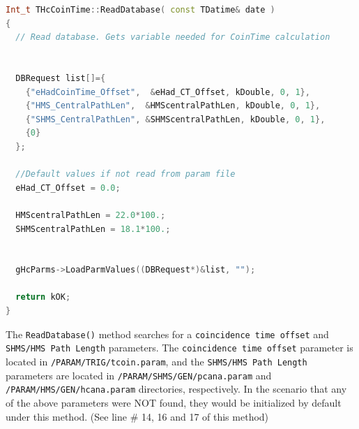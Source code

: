 \documentclass[14pt]{article}
\begin{document}
\begin{lstlisting}[language=C++, caption={THcCoinTime.cxx, The ReadDatabase() Method}] 
Int_t THcCoinTime::ReadDatabase( const TDatime& date )
{
  // Read database. Gets variable needed for CoinTime calculation


  DBRequest list[]={
    {"eHadCoinTime_Offset",  &eHad_CT_Offset, kDouble, 0, 1},  
    {"HMS_CentralPathLen",  &HMScentralPathLen, kDouble, 0, 1},
    {"SHMS_CentralPathLen", &SHMScentralPathLen, kDouble, 0, 1},
    {0}
  };
  
  //Default values if not read from param file
  eHad_CT_Offset = 0.0;

  HMScentralPathLen = 22.0*100.;
  SHMScentralPathLen = 18.1*100.;

  
  gHcParms->LoadParmValues((DBRequest*)&list, "");

  return kOK;
}
\end{lstlisting}
The \texttt{ReadDatabase()} method searches for a \texttt{coincidence time offset} and \texttt{SHMS/HMS Path Length}
parameters. The \texttt{coincidence time offset} parameter is located in \texttt{/PARAM/TRIG/tcoin.param}, and the
\texttt{SHMS/HMS Path Length} parameters are located in  \texttt{/PARAM/SHMS/GEN/pcana.param} and
\texttt{/PARAM/HMS/GEN/hcana.param} directories, respectively. In the scenario that any of the above parameters
were NOT found, they would be initialized by default under this method. (See line \# 14, 16 and 17 of this method)
\\
\end{document}
